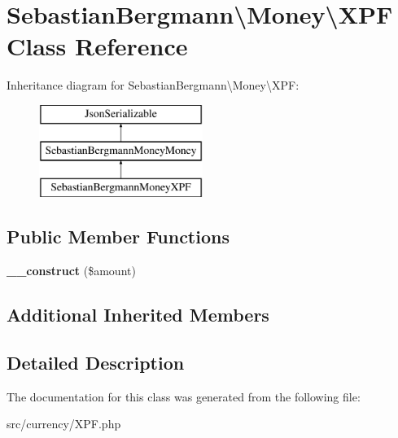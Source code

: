 \hypertarget{classSebastianBergmann_1_1Money_1_1XPF}{}\section{Sebastian\+Bergmann\textbackslash{}Money\textbackslash{}X\+P\+F Class Reference}
\label{classSebastianBergmann_1_1Money_1_1XPF}
Inheritance diagram for Sebastian\+Bergmann\textbackslash{}Money\textbackslash{}X\+P\+F\+:\begin{figure}[H]
\begin{center}
\leavevmode
\includegraphics[height=3.000000cm]{classSebastianBergmann_1_1Money_1_1XPF}
\end{center}
\end{figure}
\subsection*{Public Member Functions}
\begin{DoxyCompactItemize}
\item 
\hypertarget{classSebastianBergmann_1_1Money_1_1XPF_ab2b1cd3d6ebc46d03f1a144b5ed64cdb}{}{\bfseries \+\_\+\+\_\+construct} (\$amount)\label{classSebastianBergmann_1_1Money_1_1XPF_ab2b1cd3d6ebc46d03f1a144b5ed64cdb}

\end{DoxyCompactItemize}
\subsection*{Additional Inherited Members}


\subsection{Detailed Description}


The documentation for this class was generated from the following file\+:\begin{DoxyCompactItemize}
\item 
src/currency/X\+P\+F.\+php\end{DoxyCompactItemize}

